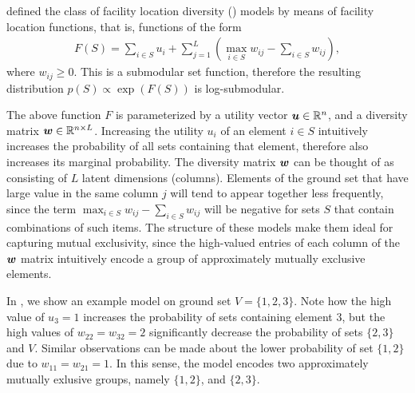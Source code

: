 \begin{example}[\flid{}] \label{ex:flid}
\cite{tschiatschek16} defined the class of facility location diversity (\flid) models by means of facility location functions, that is, functions of the form
\begin{align*}
F(S) = \sum_{i \in S} u_i + \sum_{j=1}^{L} \left(\max_{i \in S} w_{ij} - \sum_{i \in S} w_{ij}\right),
\end{align*}
where $w_{ij} \geq 0$.
This is a submodular set function, therefore the resulting distribution $p(S) \propto \exp(F(S))$ is log-submodular.

The above function $F$ is parameterized by a utility vector $\bm{u} \in \mathbb{R}^n$, and a diversity matrix $\bm{w} \in \mathbb{R}^{n\times L}$.
Increasing the utility $u_i$ of an element $i \in S$ intuitively increases the probability of all sets containing that element, therefore also increases its marginal probability.
The diversity matrix $\bm{w}$ can be thought of as consisting of $L$ latent dimensions (columns).
Elements of the ground set that have large value in the same column $j$ will tend to appear together less frequently, since the term $\max_{i \in S} w_{ij} - \sum_{i \in S} w_{ij}$ will be negative for sets $S$ that contain combinations of such items.
The structure of these models make them ideal for capturing mutual exclusivity, since the high-valued entries of each column of the $\bm{w}$ matrix intuitively encode a group of approximately mutually exclusive elements.

In , we show an example \flid{} model on ground set $V = \{1, 2, 3\}$.
Note how the high value of $u_3 = 1$ increases the probability of sets containing element $3$, but the high values of $w_{22} = w_{32} = 2$ significantly decrease the probability of sets $\{2, 3\}$ and $V$.
Similar observations can be made about the lower probability of set $\{1, 2\}$ due to $w_{11} = w_{21} = 1$.
In this sense, the model encodes two approximately mutually exlusive groups, namely $\{1, 2\}$, and $\{2, 3\}$.


\end{example}
